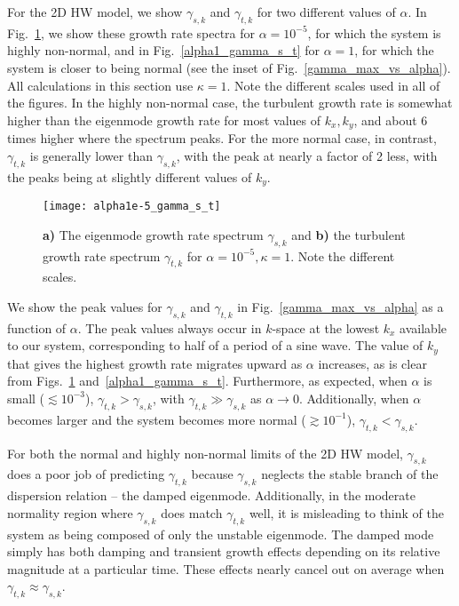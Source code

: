 \documentclass[twocolumn,showkeys,superscriptaddress]{revtex4}
\begin{document}
For the 2D HW model, we show
$\gamma_{s,k}$ and $\gamma_{t,k}$ for two different values of $\alpha$. In Fig.~\ref{alpha1e-5_gamma_s_t}, we show these growth rate spectra for $\alpha = 10^{-5}$, for which the system is
highly non-normal, and in Fig.~\ref{alpha1_gamma_s_t} for $\alpha = 1$, for which the system is closer to being normal (see the inset of Fig.~\ref{gamma_max_vs_alpha}). All calculations in this section use $\kappa=1$. 
Note the different scales used in all of the figures. In the highly
non-normal case, the turbulent growth rate is somewhat higher than the eigenmode growth rate for most values of $k_x,k_y$, and about 6 times higher where the spectrum peaks. For the more normal
case, in contrast, $\gamma_{t,k}$ is generally lower than $\gamma_{s,k}$, with the peak at nearly a factor of 2 less, with the peaks being at slightly different values of $k_y$.
\begin{figure}
\centerline{\texttt{[image: alpha1e-5\_gamma\_s\_t]}}
\caption{{\bf a)} The eigenmode growth rate spectrum $\gamma_{s,k}$ and {\bf b)} the turbulent growth rate spectrum $\gamma_{t,k}$ for $\alpha = 10^{-5}, \kappa=1$. Note the different scales.}
\label{alpha1e-5_gamma_s_t}
\end{figure}

We show the peak values for $\gamma_{s,k}$ and $\gamma_{t,k}$ in Fig.~\ref{gamma_max_vs_alpha} as a function of $\alpha$. The peak values always occur in $k$-space
at the lowest $k_x$ available to our system, corresponding to half of a period of a sine wave. The value of $k_y$ that gives the highest growth rate migrates upward as $\alpha$ increases,
as is clear from Figs.~\ref{alpha1e-5_gamma_s_t} and~\ref{alpha1_gamma_s_t}. Furthermore, as expected, when $\alpha$ is small ($\lesssim 10^{-3}$), $\gamma_{t,k} > \gamma_{s,k}$, with
$\gamma_{t,k} \gg \gamma_{s,k}$ as $\alpha \to 0$. Additionally, when $\alpha$ becomes larger and the system becomes more normal ($\gtrsim 10^{-1}$), $\gamma_{t,k} < \gamma_{s,k}$.

For both the normal and highly non-normal limits of the 2D HW model, $\gamma_{s,k}$ does a poor job of predicting $\gamma_{t,k}$ because $\gamma_{s,k}$ neglects the stable branch of the
dispersion relation -- the damped eigenmode. Additionally, in the moderate normality region where $\gamma_{s,k}$ does match $\gamma_{t,k}$ well, it is misleading to think of the system as being composed of only the
unstable eigenmode. The damped mode simply has both damping and transient growth effects depending on its relative magnitude at a particular time. These effects nearly cancel out on average when $\gamma_{t,k} \approx \gamma_{s,k}$.
\end{document}
